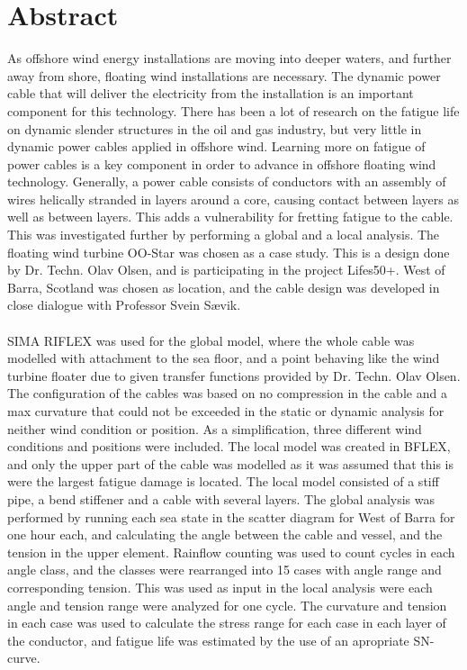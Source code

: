 \chapter*{Abstract}

As offshore wind energy installations are moving into deeper waters, and further away from shore, floating wind installations are necessary. The dynamic power cable that will deliver the electricity from the installation is an important component for this technology. There has been a lot of research on the fatigue life on dynamic slender structures in the oil and gas industry, but very little in dynamic power cables applied in offshore wind. Learning more on fatigue of power cables is a key component in order to advance in offshore floating wind technology. Generally, a power cable consists of conductors with an assembly of wires helically stranded in layers around a core, causing contact between layers as well as between layers. This adds a vulnerability for fretting fatigue to the cable. This was investigated further by performing a global and a local analysis. The floating wind turbine OO-Star was chosen as a case study. This is a design done by Dr. Techn. Olav Olsen, and is participating in the project Lifes50+. West of Barra, Scotland was chosen as location, and the cable design was developed in close dialogue with Professor Svein Sævik. \\\\SIMA RIFLEX was used for the global model, where the whole cable was modelled with attachment to the sea floor, and a point behaving like the wind turbine floater due to given transfer functions provided by Dr. Techn. Olav Olsen. The configuration of the cables was based on no compression in the cable and a max curvature that could not be exceeded in the static or dynamic analysis for neither wind condition or position. As a simplification, three different wind conditions and positions were included.  The local model was created in BFLEX, and only the upper part of the cable was modelled as it was assumed that this is were the largest fatigue damage is located. The local model consisted of a stiff pipe, a bend stiffener and a cable with several layers. \newline 
\newline
The global analysis was performed by running each sea state in the scatter diagram for West of Barra for one hour each, and calculating the angle between the cable and vessel, and the tension in the upper element. Rainflow counting was used to count cycles in each angle class, and the classes were rearranged into 15 cases with angle range and corresponding tension. This was used as input in the local analysis were each angle and tension range were analyzed for one cycle. The curvature and tension in each case was used to calculate the stress range for each case in each layer of the conductor, and fatigue life was estimated by the use of an apropriate SN-curve.  \\\\
